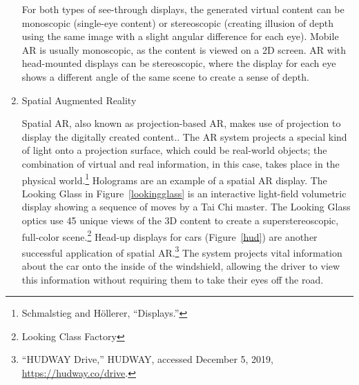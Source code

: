 \begin{enumerate}
For both types of see-through displays, the generated virtual content can be monoscopic (single-eye content) or stereoscopic (creating illusion of depth using the same image with a slight angular difference for each eye). Mobile AR is usually monoscopic, as the content is viewed on a 2D screen. AR with head-mounted displays can be stereoscopic, where the display for each eye shows a different angle of the same scene to create a sense of depth.

\item{Spatial Augmented Reality}

\begin{figure}[!ht]
\vspace{-.1 in}
\end{figure}

Spatial AR, also known as projection-based AR, makes use of projection to display the digitally created content.. The AR system projects a special kind of light onto a projection surface, which could be real-world objects; the combination of virtual and real information, in this case, takes place in the physical world.\footnote{Schmalstieg and Höllerer, “Displays.”} Holograms are an example of a spatial AR display. The Looking Glass in Figure~\ref{lookingglass} is an interactive light-field volumetric display showing a sequence of moves by a Tai Chi master. The Looking Glass optics use 45 unique views of the 3D content to create a superstereoscopic, full-color scene.\footnote{Looking Class Factory} Head-up displays for cars (Figure~\ref{hud}) are another successful application of spatial AR.\footnote{“HUDWAY Drive,” HUDWAY, accessed December 5, 2019, \url{https://hudway.co/drive}.} The system projects vital information about the car onto the inside of the windshield, allowing the driver to view this information without requiring them to take their eyes off the road.


\end{enumerate}
